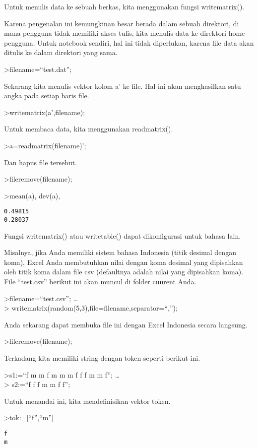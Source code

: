 \documentclass[
]{book}
\begin{document}
Untuk menulis data ke sebuah berkas, kita menggunakan fungsi writematrix().

Karena pengenalan ini kemungkinan besar berada dalam sebuah direktori, di mana pengguna tidak memiliki akses tulis, kita menulis data ke direktori home pengguna. Untuk notebook sendiri, hal ini tidak diperlukan, karena file data akan ditulis ke dalam direktori yang sama.

\textgreater filename=``test.dat'';

Sekarang kita menulis vektor kolom a' ke file. Hal ini akan menghasilkan satu angka pada setiap baris file.

\textgreater writematrix(a',filename);

Untuk membaca data, kita menggunakan readmatrix().

\textgreater a=readmatrix(filename)';

Dan hapus file tersebut.

\textgreater fileremove(filename);

\textgreater mean(a), dev(a),

\begin{verbatim}
0.49815
0.28037
\end{verbatim}

Fungsi writematrix() atau writetable() dapat dikonfigurasi untuk bahasa lain.

Misalnya, jika Anda memiliki sistem bahasa Indonesia (titik desimal dengan koma), Excel Anda membutuhkan nilai dengan koma desimal yang dipisahkan oleh titik koma dalam file csv (defaultnya adalah nilai yang dipisahkan koma). File ``test.csv'' berikut ini akan muncul di folder cuurent Anda.

\textgreater filename=``test.csv''; \ldots{}\\
\textgreater{} writematrix(random(5,3),file=filename,separator=``,'');

Anda sekarang dapat membuka file ini dengan Excel Indonesia secara langsung.

\textgreater fileremove(filename);

Terkadang kita memiliki string dengan token seperti berikut ini.

\textgreater s1:=``f m m f m m m f f f m m f''; \ldots{}\\
\textgreater{} s2:=``f f f m m f f'';

Untuk menandai ini, kita mendefinisikan vektor token.

\textgreater tok:={[}``f'',``m''{]}

\begin{verbatim}
f
m
\end{verbatim}
\end{document}
